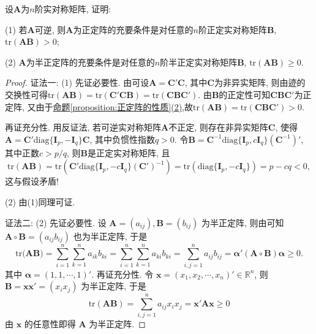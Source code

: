 \documentclass[../../main.tex]{subfiles}
\begin{document}
\begin{proposition}\label{proposition:正定和半正定阵关于迹的判定准则}
设$\boldsymbol{A}$为$n$阶实对称矩阵, 证明:

(1) 若$\boldsymbol{A}$可逆, 则$\boldsymbol{A}$为正定阵的充要条件是对任意的$n$阶正定实对称矩阵$\boldsymbol{B}$, $\text{tr}(\boldsymbol{A}\boldsymbol{B})>0$;

(2) $\boldsymbol{A}$为半正定阵的充要条件是对任意的$n$阶半正定实对称矩阵$\boldsymbol{B}$, $\text{tr}(\boldsymbol{A}\boldsymbol{B})\geq 0$.
\end{proposition}
\begin{proof}
{\color{blue}证法一:}
(1) 先证必要性. 由可设$\boldsymbol{A}=\boldsymbol{C}'\boldsymbol{C}$, 其中$\boldsymbol{C}$为非异实矩阵, 则由迹的交换性可得$\text{tr}(\boldsymbol{A}\boldsymbol{B}) = \text{tr}(\boldsymbol{C}'\boldsymbol{C}\boldsymbol{B}) = \text{tr}(\boldsymbol{C}\boldsymbol{B}\boldsymbol{C}')$. 由$\boldsymbol{B}$的正定性可知$\boldsymbol{C}\boldsymbol{B}\boldsymbol{C}'$为正定阵, 又由于\hyperref[proposition:正定阵的性质]{命题\ref{proposition:正定阵的性质}(2)},故$\text{tr}(\boldsymbol{A}\boldsymbol{B}) = \text{tr}(\boldsymbol{C}\boldsymbol{B}\boldsymbol{C}')>0$.

再证充分性. 用反证法, 若可逆实对称矩阵$\boldsymbol{A}$不正定, 则存在非异实矩阵$\boldsymbol{C}$, 使得$\boldsymbol{A}=\boldsymbol{C}'\text{diag}\{\boldsymbol{I}_p, -\boldsymbol{I}_q\}\boldsymbol{C}$, 其中负惯性指数$q > 0$. 令$\boldsymbol{B}=\boldsymbol{C}^{-1}\text{diag}\{\boldsymbol{I}_p, c\boldsymbol{I}_q\}(\boldsymbol{C}^{-1})'$, 其中正数$c > p/q$, 则$\boldsymbol{B}$是正定实对称矩阵, 且
\[
\text{tr}(\boldsymbol{A}\boldsymbol{B}) = \text{tr}\left(\boldsymbol{C}'\text{diag}\{\boldsymbol{I}_p, -c\boldsymbol{I}_q\}(\boldsymbol{C}')^{-1}\right) = \text{tr}(\text{diag}\{\boldsymbol{I}_p, -c\boldsymbol{I}_q\}) = p - cq < 0,
\]
这与假设矛盾!

(2) 由(1)同理可证. 

{\color{blue}证法二:}
(2) 先证必要性. 设 \(\boldsymbol{A}=(a_{ij}),\boldsymbol{B}=(b_{ij})\) 为半正定阵, 则由可知 \(\boldsymbol{A}\circ\boldsymbol{B}=(a_{ij}b_{ij})\) 也为半正定阵, 于是
\[\mathrm{tr(}\boldsymbol{AB})=\sum_{i=1}^n{\sum_{k=1}^n{a_{ik}b_{ki}}}=\sum_{i=1}^n{\sum_{k=1}^n{a_{ki}b_{ki}}}=\sum_{i,j=1}^n{a_{ij}b_{ij}}=\boldsymbol{\alpha }'(\boldsymbol{A}\circ \boldsymbol{B})\boldsymbol{\alpha }\ge 0.\]
其中 \(\boldsymbol{\alpha}=(1,1,\cdots,1)'\). 再证充分性. 令 \(\boldsymbol{x}=(x_1,x_2,\cdots,x_n)'\in\mathbb{R}^n\), 则 \(\boldsymbol{B}=\boldsymbol{x}\boldsymbol{x}'=(x_ix_j)\) 为半正定阵, 于是
\[\mathrm{tr}(\boldsymbol{A}\boldsymbol{B})=\sum_{i,j = 1}^{n}a_{ij}x_ix_j=\boldsymbol{x}'\boldsymbol{A}\boldsymbol{x}\geq0\]
由 \(\boldsymbol{x}\) 的任意性即得 \(\boldsymbol{A}\) 为半正定阵.


\end{proof}
\end{document}
